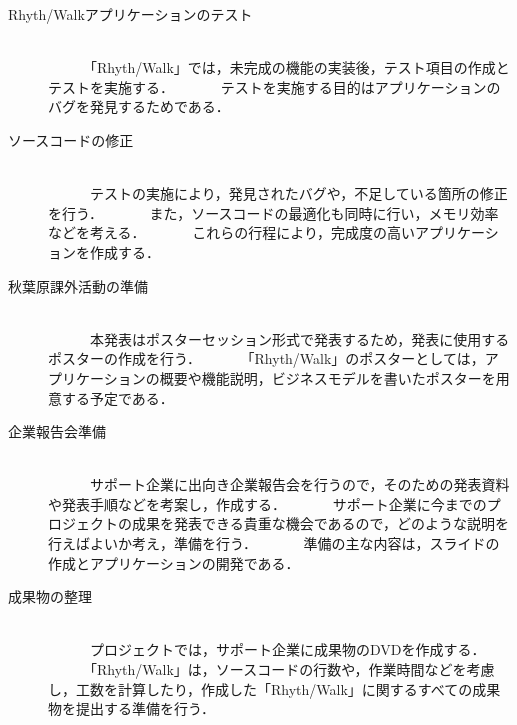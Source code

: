 \begin{description}
\item
[Rhyth/Walkアプリケーションのテスト]\mbox{}\\
　　　「Rhyth/Walk」では，未完成の機能の実装後，テスト項目の作成とテストを実施する．
　　　テストを実施する目的はアプリケーションのバグを発見するためである．

\item[ソースコードの修正]\mbox{}\\
　　　テストの実施により，発見されたバグや，不足している箇所の修正を行う．
　　　また，ソースコードの最適化も同時に行い，メモリ効率などを考える．
　　　これらの行程により，完成度の高いアプリケーションを作成する．

\item[秋葉原課外活動の準備]\mbox{}\\
　　　本発表はポスターセッション形式で発表するため，発表に使用するポスターの作成を行う．
　　　「Rhyth/Walk」のポスターとしては，アプリケーションの概要や機能説明，ビジネスモデルを書いたポスターを用意する予定である．

\item[企業報告会準備]\mbox{}\\
　　　サポート企業に出向き企業報告会を行うので，そのための発表資料や発表手順などを考案し，作成する．
　　　サポート企業に今までのプロジェクトの成果を発表できる貴重な機会であるので，どのような説明を行えばよいか考え，準備を行う．
　　　準備の主な内容は，スライドの作成とアプリケーションの開発である．

\item[成果物の整理]\mbox{}\\
　　　プロジェクトでは，サポート企業に成果物のDVDを作成する．
　　　「Rhyth/Walk」は，ソースコードの行数や，作業時間などを考慮し，工数を計算したり，作成した「Rhyth/Walk」に関するすべての成果物を提出する準備を行う．

\end{description}

